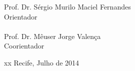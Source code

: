 \begin{titlepage}
  \begin{flushright}
    Prof. Dr. Sérgio Murilo Maciel Fernandes\\
    Orientador\\
    \qquad\\
    Prof. Dr. Mêuser Jorge Valença\\
    Coorientador\\
  \end{flushright}

\begin{center}
  {\color{white} xx}\vfill
  Recife, Julho de 2014
\end{center}

\end{titlepage}

